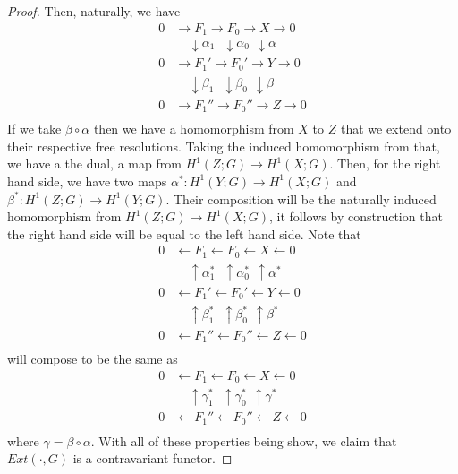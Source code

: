 \documentclass{article}
\theoremstyle{definition}
\begin{document}
\begin{proof}
        Then, naturally, we have 
        \begin{align*}
            0 &\to F_1 \to F_0 \to X \to 0 \\
            & \ \ \ \ \ \downarrow\alpha_1 \ \ \ \downarrow\alpha_0 \ \ \downarrow\alpha \\
            0 &\to F_1' \to F_0' \to Y \to 0 \\
            & \ \ \ \ \ \downarrow\beta_1 \ \ \ \downarrow\beta_0 \ \ \downarrow\beta \\
            0 &\to F_1'' \to F_0'' \to Z \to 0 \\
        \end{align*}
        If we take $\beta \circ \alpha$ then we have a homomorphism from 
        $X$ to $Z$ that we extend onto their respective free resolutions. 
        Taking the induced homomorphism from that, we have a the dual, 
        a map from $H^1(Z;G) \to H^1(X;G)$. Then, for the right hand side, 
        we have two maps $\alpha^*: H^1(Y;G) \to H^1(X;G)$ and $\beta^*: H^1(Z;G) \to H^1(Y;G)$.
        Their composition will be the naturally induced homomorphism from $H^1(Z;G) \to H^1(X;G)$,
        it follows by construction that the right hand side will be equal to the left hand side. 
        Note that 
        \begin{align*}
            0 &\leftarrow F_1 \leftarrow F_0 \leftarrow X \leftarrow 0 \\
            & \ \ \ \ \ \uparrow\alpha_1^* \ \ \ \uparrow\alpha_0^* \ \ \uparrow\alpha^* \\
            0 &\leftarrow F_1' \leftarrow F_0' \leftarrow Y \leftarrow 0 \\
            & \ \ \ \ \ \uparrow\beta_1^* \ \ \ \uparrow\beta_0^* \ \ \uparrow\beta^* \\
            0 &\leftarrow F_1'' \leftarrow F_0'' \leftarrow Z \leftarrow 0 \\
        \end{align*}
        will compose to be the same as
        \begin{align*}
            0 &\leftarrow F_1 \leftarrow F_0 \leftarrow X \leftarrow 0 \\
            & \ \ \ \ \ \uparrow\gamma_1^* \ \ \ \uparrow\gamma_0^* \ \ \uparrow\gamma^* \\
            0 &\leftarrow F_1'' \leftarrow F_0'' \leftarrow Z \leftarrow 0 \\
        \end{align*}
        where $\gamma = \beta \circ \alpha$.
        With all of these properties being show, we claim that $Ext(\cdot,G)$ is a contravariant 
        functor.
    \end{proof}
\end{document}
